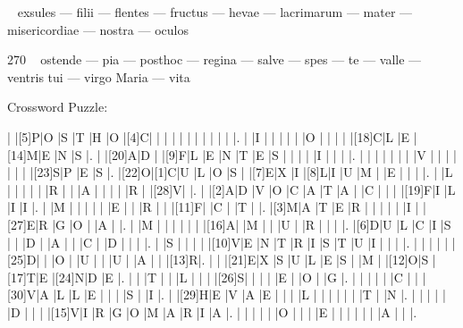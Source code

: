 \documentclass[12pt]{article}
\begin{document}
\pagestyle{fancy}
\fancyhf{}
\renewcommand{\headrulewidth}{0pt}
\renewcommand{\footrulewidth}{0pt}
\libertine
\renewcommand\PuzzleClueFont{\rm\normalsize}
\noindent\begin{rotate}{0}
~ \qquad \small exsules ---  filii ---  flentes ---  fructus ---  hevae ---  lacrimarum --- mater ---  misericordiae ---  nostra ---  oculos 
\end{rotate}
\hfill
\begin{rotate}{270}
~ \qquad \small  ostende ---  pia ---  posthoc ---  regina ---  salve ---  spes ---  te ---  valle --- ventris tui ---  virgo Maria ---  vita
\end{rotate}
\begin{center}
  \huge{Crossword Puzzle:}
\end{center}
\vspace{1.5cm}
\begin{Puzzle}{20}{20}
  |{}  |[5]P|O   |S   |T   |H   |O   |[4]C|{}  |{}  |{}  |{}  |{}  |{}  |{}  |{}  |{}  |{}  |{}  |.
  |{}  |I   |{}  |{}  |{}  |{}  |{}  |O   |{}  |{}  |{}  |{}  |[18]C|L   |E   |[14]M|E   |N   |S   |.
  |{}  |[20]A|D   |{}  |[9]F|L   |E   |N   |T   |E   |S   |{}  |{}  |{}  |{}  |I   |{}  |{}  |{}  |.
  |{}  |{}  |{}  |{}  |{}  |{}  |{}  |V   |{}  |{}  |{}  |{}  |{}  |{}  |{}  |[23]S|P   |E   |S   |.
  |[22]O|[1]C|U   |L   |O   |S   |{}  |[7]E|X   |I   |[8]L|I   |U   |M   |{}  |E   |{}  |{}  |{}  |.
  |{}  |L   |{}  |{}  |{}  |{}  |{}  |R   |{}  |{}  |A   |{}  |{}  |{}  |{}  |R   |{}  |[28]V|{}  |.
  |{}  |[2]A|D   |V   |O   |C   |A   |T   |A   |{}  |C   |{}  |{}  |{}  |[19]F|I   |L   |I   |I   |.
  |{}  |M   |{}  |{}  |{}  |{}  |{}  |E   |{}  |{}  |R   |{}  |{}  |[11]F|{}  |C   |{}  |T   |{}  |.
  |[3]M|A   |T   |E   |R   |{}  |{}  |{}  |{}  |{}  |I   |{}  |[27]E|R   |G   |O   |{}  |A   |{}  |.
  |{}  |M   |{}  |{}  |{}  |{}  |{}  |{}  |[16]A|{}  |M   |{}  |{}  |U   |{}  |R   |{}  |{}  |{}  |.
  |[6]D|U   |L   |C   |I   |S   |{}  |{}  |D   |{}  |A   |{}  |{}  |C   |{}  |D   |{}  |{}  |{}  |.
  |{}  |S   |{}  |{}  |{}  |{}  |[10]V|E   |N   |T   |R   |I   |S   |T   |U   |I   |{}  |{}  |{}  |.
  |{}  |{}  |{}  |{}  |{}  |[25]D|{}  |{}  |O   |{}  |U   |{}  |{}  |U   |{}  |A   |{}  |{}  |[13]R|.
  |{}  |{}  |[21]E|X   |S   |U   |L   |E   |S   |{}  |M   |{}  |[12]O|S   |[17]T|E   |[24]N|D   |E   |.
  |{}  |{}  |T   |{}  |{}  |L   |{}  |{}  |{}  |[26]S|{}  |{}  |{}  |{}  |E   |{}  |O   |{}  |G   |.
  |{}  |{}  |{}  |{}  |{}  |C   |{}  |{}  |[30]V|A   |L   |L   |E   |{}  |{}  |{}  |S   |{}  |I   |.
  |{}  |[29]H|E   |V   |A   |E   |{}  |{}  |{}  |L   |{}  |{}  |{}  |{}  |{}  |{}  |T   |{}  |N   |.
  |{}  |{}  |{}  |{}  |{}  |D   |{}  |{}  |{}  |[15]V|I   |R   |G   |O   |M   |A   |R   |I   |A   |.
  |{}  |{}  |{}  |{}  |{}  |O   |{}  |{}  |{}  |E   |{}  |{}  |{}  |{}  |{}  |{}  |A   |{}  |{}  |.
\end{Puzzle}
\end{document}
